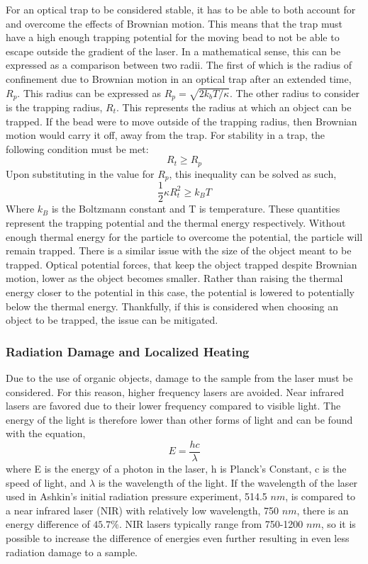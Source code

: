 \documentclass[%
 aip,
 amsmath,amssymb,
 reprint,%
]{revtex4-1}
\begin{document}
    For an optical trap to be considered stable, it has to be able to both account for and overcome the effects of Brownian motion. This means that the trap must have a high enough trapping potential for the moving bead to not be able to escape outside the gradient of the laser. In a mathematical sense, this can be expressed as a comparison between two radii. The first of which is the radius of confinement due to Brownian motion in an optical trap after an extended time, $R_p$. This radius can be expressed as $R_p = \sqrt{2 k_b T / \kappa}$. The other radius to consider is the trapping radius, $R_t$. This represents the radius at which an object can be trapped\cite{brownian}. If the bead were to move outside of the trapping radius, then Brownian motion would carry it off, away from the trap. For stability in a trap, the following condition must be met:
    \begin{equation}
        R_t \geq R_p
    \end{equation}
    Upon substituting in the value for $R_p$, this inequality can be solved as such,
    \begin{equation}
        \frac{1}{2} \kappa R_t^2 \geq k_B T
    \end{equation}
    Where $k_B$ is the Boltzmann constant and T is temperature. These quantities represent the trapping potential and the thermal energy respectively\cite{brownian}. Without enough thermal energy for the particle to overcome the potential, the particle will remain trapped. There is a similar issue with the size of the object meant to be trapped. Optical potential forces, that keep the object trapped despite Brownian motion, lower as the object becomes smaller\cite{brownian}. Rather than raising the thermal energy closer to the potential in this case, the potential is lowered to potentially below the thermal energy. Thankfully, if this is considered when choosing an object to be trapped, the issue can be mitigated.


        \subsubsection{\label{sec:level3}Radiation Damage and Localized Heating}
    Due to the use of organic objects, damage to the sample from the laser must be considered. For this reason, higher frequency lasers are avoided. Near infrared lasers are favored due to their lower frequency compared to visible light. The energy of the light is therefore lower than other forms of light and can be found with the equation,
        \begin{equation}
            E = \frac{hc}{\lambda}
        \end{equation}
    where E is the energy of a photon in the laser, h is Planck's Constant, c is the speed of light, and $\lambda$ is the wavelength of the light. If the wavelength of the laser used in Ashkin's initial radiation pressure experiment, 514.5 $nm$, is compared to a near infrared laser (NIR) with relatively low wavelength, 750 $nm$, there is an energy difference of $45.7\%$. NIR lasers typically range from 750-1200 $nm$\cite{NIR}, so it is possible to increase the difference of energies even further resulting in even less radiation damage to a sample. 
    
\end{document}
